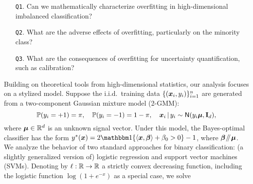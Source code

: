 \begin{enumerate}
    \item[\texttt{Q1}.] Can we mathematically characterize overfitting in high-dimensional imbalanced classification?
    \item[\texttt{Q2}.] What are the adverse effects of overfitting, particularly on the minority class?
    \item[\texttt{Q3}.]
    What are the consequences of overfitting for uncertainty quantification, such as calibration?
\end{enumerate}
Building on theoretical tools from high-dimensional statistics, our  analysis focuses on a stylized model. Suppose the i.i.d.~training data $\{({\boldsymbol{x}}_i, y_i)\}_{i = 1}^n$ are generated from a two-component Gaussian mixture model (2-GMM):
\begin{equation}\label{model}
    \mathbb{P}(y_i = +1) = \pi, \quad \mathbb{P}(y_i = -1) = 1 - \pi, \quad \text{\boldmath $x$}_i \,|\, y_i \sim {\sf N}(y_i \text{\boldmath $\mu$}, \mathrm{\bf I}_d),
\end{equation}
where $\text{\boldmath $\mu$} \in \mathbb{R}^d$ is an unknown signal vector. Under this model, the Bayes-optimal classifier has the form $y^* (\xx) = 2\ind\{\langle \vx, \vbeta \rangle + \beta_0 > 0\} - 1$,
where ${\boldsymbol{\beta}} \mathbin{\!/\mkern-5mu/\!} {\boldsymbol{\mu}}$. We analyze the behavior of two standard approaches for binary classification: (a slightly generalized version of) logistic regression and support vector machines (SVMs). Denoting by $\ell: \mathbb{R} \to \mathbb{R}$ a strictly convex decreasing function, including the logistic function $\log(1 + e^{-x})$ as a special case, we solve

